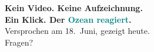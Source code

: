 \documentclass[aspectratio=169]{beamer}
\begin{document}
    \begin{frame}[plain]
  \centering
  \vspace{2.2cm}
  {\LARGE\bfseries Kein Video. Keine Aufzeichnung.\\[0.25cm]
  Ein Klick. Der \textcolor{teal}{Ozean reagiert}.}\\[1.2cm]
  {\color{foam!75} Versprochen am 18.\ Juni, gezeigt heute.}\\[1.6cm]
  {\color{foam!55}\small Fragen?}
    \end{frame}
\end{document}
